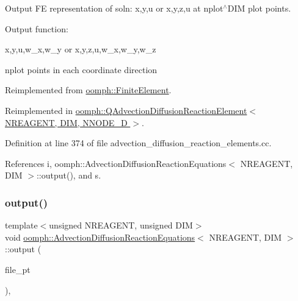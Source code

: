 Output FE representation of soln\+: x,y,u or x,y,z,u at nplot$^\wedge$\+D\+IM plot points. 

Output function\+:

x,y,u,w\+\_\+x,w\+\_\+y or x,y,z,u,w\+\_\+x,w\+\_\+y,w\+\_\+z

nplot points in each coordinate direction 

Reimplemented from \hyperlink{classoomph_1_1FiniteElement_afa9d9b2670f999b43e6679c9dd28c457}{oomph\+::\+Finite\+Element}.



Reimplemented in \hyperlink{classoomph_1_1QAdvectionDiffusionReactionElement_acafd4d0efa43a6c63600c8f1e8823c5b}{oomph\+::\+Q\+Advection\+Diffusion\+Reaction\+Element$<$ N\+R\+E\+A\+G\+E\+N\+T, D\+I\+M, N\+N\+O\+D\+E\+\_\+D $>$}.



Definition at line 374 of file advection\+\_\+diffusion\+\_\+reaction\+\_\+elements.\+cc.



References i, oomph\+::\+Advection\+Diffusion\+Reaction\+Equations$<$ N\+R\+E\+A\+G\+E\+N\+T, D\+I\+M $>$\+::output(), and s.

\mbox{\label{classoomph_1_1AdvectionDiffusionReactionEquations_abb205e32ac157870312dd5d1180233b1}} 
\subsubsection{\texorpdfstring{output()}{output()}\hspace{0.1cm}{\footnotesize\ttfamily [3/4]}}
{\footnotesize\ttfamily template$<$unsigned N\+R\+E\+A\+G\+E\+NT, unsigned D\+IM$>$ \\
void \hyperlink{classoomph_1_1AdvectionDiffusionReactionEquations}{oomph\+::\+Advection\+Diffusion\+Reaction\+Equations}$<$ N\+R\+E\+A\+G\+E\+NT, D\+IM $>$\+::output (\begin{DoxyParamCaption}\item[{F\+I\+LE $\ast$}]{file\+\_\+pt }\end{DoxyParamCaption})\hspace{0.3cm}{\ttfamily [inline]}, {\ttfamily [virtual]}}



